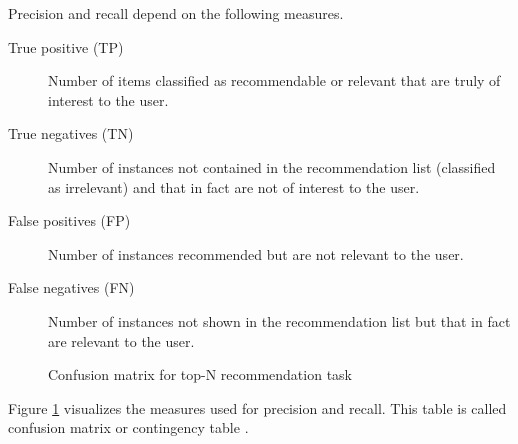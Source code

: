 Precision and recall depend on the following measures.
\begin{description}
\item[True positive (TP)] Number of items classified as recommendable or relevant that are truly of interest to the user. 
\item[True negatives (TN)] Number of instances not contained in the recommendation list (classified as irrelevant) and that in fact are not of interest to the user.
\item[False positives (FP)] Number of instances recommended but are not relevant to the user.
\item[False negatives (FN)] Number of instances not shown in the recommendation list but that in fact are relevant to the user.
\end{description}


\begin{figure}
\centering
{}
\caption{Confusion matrix for top-N recommendation task}
\label{fig:confusionmatrix}
\end{figure}

Figure \ref{fig:confusionmatrix} visualizes the measures used for precision and recall. This table is called confusion matrix or contingency table \cite{Manning}. 

